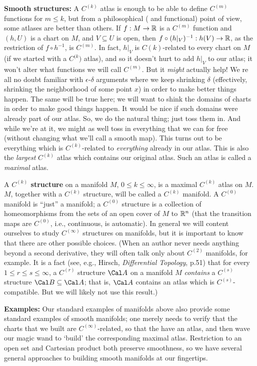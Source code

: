{\bf Smooth structures:} A $C^{(k)}$ atlas is enough to be able to define $C^{(m)}$ 
functions for $m\leq k$, but from 
a philosophical ( and functional) point of view, some atlases are better than others. 
If $f:M\rightarrow{\Bbb R}$
is a $C^{(m)}$ function and $(h,U)$ is a chart on $M$, and $V\subseteq U$ is open,
then
$f\circ (h|_V)^{-1}:h(V)\rightarrow {\Bbb R}$, as the restriction of $f\circ h^{-1}$, is $C^{(m)}$.
In fact, $h|_V$ is $C{(k)}$-related to every chart on $M$ (if we started with a $C^{(k})$
atlas), and so it doesn't hurt to add $h|_V$ to our atlas; it won't alter what functions
we will call $C^{(m)}$. But it {\it might} actually help! We re all no doubt familiar
with $\epsilon$-$\delta$ arguments where we keep shrinking $\delta$ (effectively, shrinking
the neighborhood of some point $x$) in order to make better things happen. The same will be
true here; we will want to shink the domains of charts in order to make good things happen.
It would be nice if such domains were already part of our atlas. So, we do the natural
thing; just toss them in. And while we're at it, we might as well toss in everything that
we can for free (without changing what we'll call a smooth map). This turns out to be
everything which is $C^{(k)}$-related to {\it everything} already in our atlas. This is
also the {\it largest} $C^{(k)}$ atlas which contains our original atlas. Such an
atlas is called a {\it maximal} atlas.

A {\bf $C^{(k)}$ structure} on a manifold $M$, $0\leq k\leq \infty$, is a maximal
$C^{(k)}$ atlas on $M$. $M$, together with a $C^{(k)}$ structure, will be called
a $C^{(k)}$ manifold. A $C^{(0)}$ manifold is ``just'' a manifold;  a $C^{(0)}$ structure
is a collection of homeomorphisms from the sets of an open cover of $M$ to ${\Bbb R}^n$
(that the transition maps are $C^{(0)}$, i.e., continuous, is automatic). In general
we will content ourselves to study $C^{(\infty)}$ structures on manifolds, but it 
is important to know that there are other possible choices. (When an author never
needs anything beyond a second derivative, they will often talk only about 
$C^{(2)}$ manifolds, for example. It is a fact (see, e.g., Hirsch, {\it Differential
Topology}, p.51) that for every $1\leq r\leq s\leq \infty$, a $C^{(r)}$ structure $\Cal A$
on a manifold $M$ {\it contains} a $C^{(s)}$ structure $\Cal B\subseteq \Cal A$;
that is, $\Cal A$ contains an atlas which is $C^{(s)}$-compatible. 
But we will likely not use this result.)

\msk


{\bf Examples:} Our standard examples of manifolds above also provide some standard examples of smooth
manifolds; one merely needs to verify that the charts that we built are $C^{(\infty)}$-related,
so that the have an atlas, and then wave our magic wand to `build' the corresponding
maximal atlas. Restriction to an open set and Cartesian product both
preserve smoothness, so we have several general approaches to building smooth
manifolds at our fingertips.

